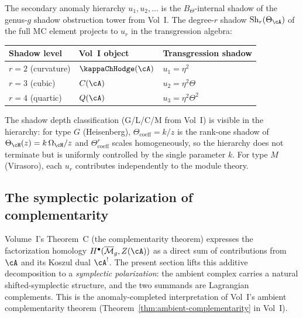 \begin{remark}
The secondary anomaly hierarchy $u_1, u_2, \dots$ is the
$B_\Theta$-internal shadow of the genus-$g$ shadow obstruction
tower from Vol~I.
The degree-$r$ shadow $\mathrm{Sh}_r(\Theta_\cA)$ of the
full MC element projects to $u_r$ in the transgression algebra:
\begin{center}
\renewcommand{\arraystretch}{1.2}
\begin{tabular}{lll}
\textbf{Shadow level} & \textbf{Vol~I object} &
\textbf{Transgression shadow} \\
\hline
$r = 2$ (curvature) & $\kappaChHodge(\cA)$ & $u_1 = \eta^2$ \\
$r = 3$ (cubic) & $C(\cA)$ & $u_2 = \eta^2 \Theta$ \\
$r = 4$ (quartic) & $Q(\cA)$ & $u_3 = \eta^2 \Theta^2$
\end{tabular}
\end{center}
The shadow depth classification (G/L/C/M from Vol~I) is
visible in the hierarchy: for type $G$ (Heisenberg),
$\Theta_{\mathrm{coeff}} = k/z$ is the rank-one shadow of
$\Theta_{\cH}(z)=k\,\Omega_{\cH}/z$ and
$\Theta_{\mathrm{coeff}}^r$ scales homogeneously, so the
hierarchy does not terminate but is uniformly controlled by
the single parameter $k$.
For type $M$ (Virasoro), each $u_r$ contributes independently
to the module theory.
\end{remark}

\subsection{The symplectic polarization of complementarity}


Volume~I's Theorem~C (the complementarity theorem) expresses
the factorization homology $H^\bullet(\Mbar_g, Z(\cA))$
as a direct sum of contributions from $\cA$ and its Koszul
dual $\cA^!$.
The present section lifts this additive decomposition to a
\emph{symplectic polarization}: the ambient complex carries a
natural shifted-symplectic structure, and the two summands are
Lagrangian complements.
This is the anomaly-completed interpretation of
Vol~I's ambient complementarity theorem
(Theorem~\ref*{thm:ambient-complementarity} in Vol~I).

